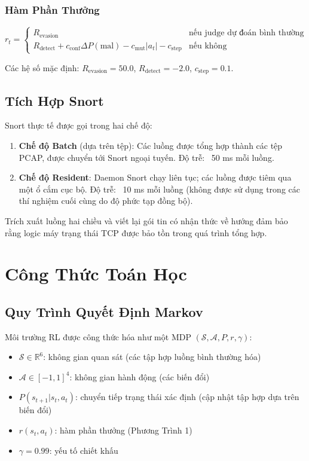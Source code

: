 \documentclass[12pt,a4paper]{report}
\begin{document}
\subsection{Hàm Phần Thưởng}

\begin{equation}
r_t = \begin{cases}
R_{\text{evasion}} & \text{nếu judge dự đoán bình thường} \\
R_{\text{detect}} + c_{\text{conf}} \Delta P(\text{mal}) - c_{\text{mut}} |a_t| - c_{\text{step}} & \text{nếu không}
\end{cases}
\end{equation}

Các hệ số mặc định: $R_{\text{evasion}} = 50.0$, $R_{\text{detect}} = -2.0$, $c_{\text{step}} = 0.1$.

\section{Tích Hợp Snort}

Snort thực tế được gọi trong hai chế độ:

\begin{enumerate}
  \item \textbf{Chế độ Batch} (dựa trên tệp): Các luồng được tổng hợp thành các tệp PCAP, được chuyển tới Snort ngoại tuyến. Độ trễ: ~50 ms mỗi luồng.
  
  \item \textbf{Chế độ Resident}: Daemon Snort chạy liên tục; các luồng được tiêm qua một ổ cắm cục bộ. Độ trễ: ~10 ms mỗi luồng (không được sử dụng trong các thí nghiệm cuối cùng do độ phức tạp đồng bộ).
\end{enumerate}

Trích xuất luồng hai chiều và viết lại gói tin có nhận thức về hướng đảm bảo rằng logic máy trạng thái TCP được bảo tồn trong quá trình tổng hợp.

\chapter{Công Thức Toán Học}

\section{Quy Trình Quyết Định Markov}

Môi trường RL được công thức hóa như một MDP $(\mathcal{S}, \mathcal{A}, P, r, \gamma)$:

\begin{itemize}
  \item $\mathcal{S} \in \mathbb{R}^6$: không gian quan sát (các tập hợp luồng bình thường hóa)
  \item $\mathcal{A} \in [-1, 1]^4$: không gian hành động (các biến đổi)
  \item $P(s_{t+1} | s_t, a_t)$: chuyển tiếp trạng thái xác định (cập nhật tập hợp dựa trên biến đổi)
  \item $r(s_t, a_t)$: hàm phần thưởng (Phương Trình 1)
  \item $\gamma = 0.99$: yếu tố chiết khấu
\end{itemize}
\end{document}

